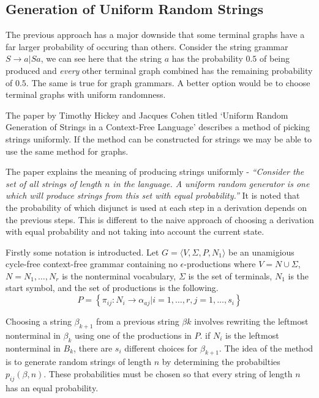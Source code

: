   \subsection{Generation of Uniform Random Strings}

  The previous approach has a major downside that some terminal graphs have a far larger probability of occuring than others. Consider the string grammar $S \to a | Sa$, we can see here that the string $a$ has the probability $0.5$ of being produced and \emph{every} other terminal graph combined has the remaining probability of $0.5$. The same is true for graph grammars. A better option would be to choose terminal graphs with uniform randomness.

  The paper by Timothy Hickey and Jacques Cohen titled `Uniform Random Generation of Strings in a Context-Free Language' describes a method of picking strings uniformly. If the method can be constructed for strings we may be able to use the same method for graphs.

  The paper explains the meaning of producing strings uniformly - \emph{``Consider the set of all strings of length $n$ in the language. A uniform random generator is one which will produce strings from this set with equal probability.''} It is noted that the probability of which disjunct is used at each step in a derivation depends on the previous steps. This is different to the naive approach of choosing a derivation with equal probability and not taking into account the current state.

  Firstly some notation is introducted. Let $G = \langle V, \Sigma, P, N_1 \rangle$ be an unamigious cycle-free context-free grammar containing no $\epsilon$-productions where $V = N \cup \Sigma$, $N = {N_1,\dots,N_r}$ is the nonterminal vocabulary, $\Sigma$ is the set of terminals, $N_1$ is the start symbol, and the set of productions is the following.
  \[P = \left\{\pi_{ij} : N_i \to \alpha_{aj} | i = 1,\dots,r, j = 1, \dots,s_i \right\}\]

  Choosing a string $\beta_{k+1}$ from a previous string $\beta{k}$ involves rewriting the leftmost nonterminal in $\beta_k$ using one of the productions in $P$. if $N_i$ is the leftmost nonterminal in $B_k$, there are $s_i$ different choices for $\beta_{k+1}$. The idea of the method is to generate random strings of length $n$ by determining the probabilties $p_{ij}(\beta, n)$. These probabilities must be chosen so that every string of length $n$ has an equal probability.

